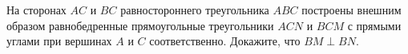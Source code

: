 \begin{ex}
	\begin{condition}
		На сторонах \( AC \) и \( BC  \) равностороннего треугольника \( ABC  \) построены внешним образом равнобедренные прямоугольные треугольники \( ACN  \) и \( BCM  \) с прямыми углами при вершинах \( A  \) и \( C  \) соответственно. Докажите, что \( BM \perp BN\).
	\end{condition}
\end{ex}